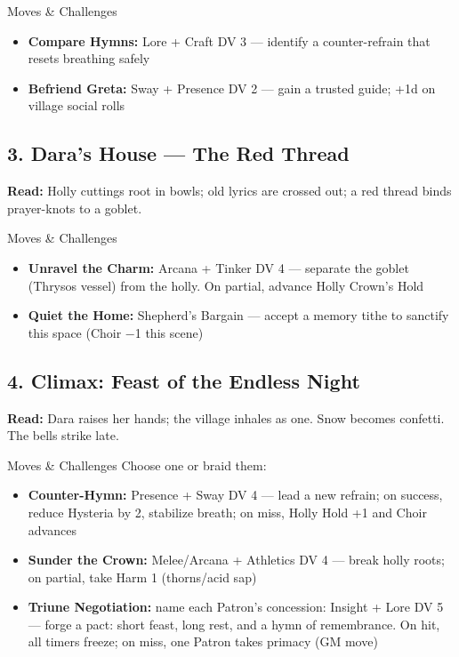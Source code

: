 \documentclass[11pt]{article}
\begin{document}
\begin{mechanicsbox}{Moves \& Challenges}
\begin{itemize}
    \item \textbf{Compare Hymns:} Lore + Craft DV 3 --- identify a counter-refrain that resets breathing safely
    \item \textbf{Befriend Greta:} Sway + Presence DV 2 --- gain a trusted guide; +1d on village social rolls
\end{itemize}
\end{mechanicsbox}

\subsection*{3. Dara's House --- The Red Thread}
\textbf{Read:} Holly cuttings root in bowls; old lyrics are crossed out; a red thread binds prayer-knots to a goblet.

\begin{mechanicsbox}{Moves \& Challenges}
\begin{itemize}
    \item \textbf{Unravel the Charm:} Arcana + Tinker DV 4 --- separate the goblet (Thrysos vessel) from the holly. On partial, advance Holly Crown's Hold
    \item \textbf{Quiet the Home:} Shepherd's Bargain --- accept a memory tithe to sanctify this space (Choir −1 this scene)
\end{itemize}
\end{mechanicsbox}

\subsection*{4. Climax: Feast of the Endless Night}
\textbf{Read:} Dara raises her hands; the village inhales as one. Snow becomes confetti. The bells strike late.

\begin{mechanicsbox}{Moves \& Challenges}
Choose one or braid them:
\begin{itemize}
    \item \textbf{Counter-Hymn:} Presence + Sway DV 4 --- lead a new refrain; on success, reduce Hysteria by 2, stabilize breath; on miss, Holly Hold +1 and Choir advances
    \item \textbf{Sunder the Crown:} Melee/Arcana + Athletics DV 4 --- break holly roots; on partial, take Harm 1 (thorns/acid sap)
    \item \textbf{Triune Negotiation:} name each Patron's concession: Insight + Lore DV 5 --- forge a pact: short feast, long rest, and a hymn of remembrance. On hit, all timers freeze; on miss, one Patron takes primacy (GM move)
\end{itemize}
\end{mechanicsbox}
\end{document}
